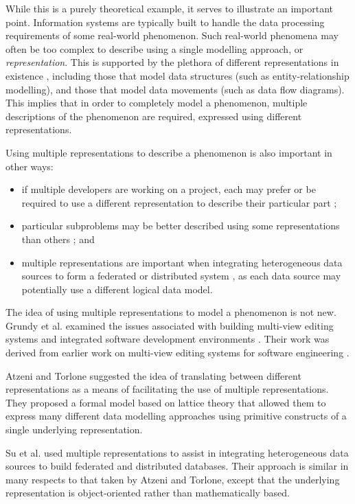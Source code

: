 \documentclass[10pt]{llncs}
\begin{document}
While this is a purely theoretical example, it serves to illustrate an important point. Information systems are typically built to handle the data processing requirements of some real-world phenomenon. Such real-world phenomena may often be too complex to describe using a single modelling approach, or \emph{representation}. This is supported by the plethora of different representations in existence \cite{Hull:R:1987,Tsic:D:1982}, including those that model data structures (such as entity-relationship modelling), and those that model data movements (such as data flow diagrams). This implies that in order to completely model a phenomenon, multiple descriptions of the phenomenon are required, expressed using different representations.

Using multiple representations to describe a phenomenon is also important in other ways:
\begin{itemize}
	\item if multiple developers are working on a project, each may prefer or be required to use a different representation to describe their particular part \cite{Atze:P:1996:EDBT};
	\item particular subproblems may be better described using some representations than others \cite{East:SM:1991:PhD}; and
	\item multiple representations are important when integrating heterogeneous data sources to form a federated or distributed system \cite{Atze:P:1996:EDBT}, as each data source may potentially use a different logical data model.
\end{itemize}

The idea of using multiple representations to model a phenomenon is not new. Grundy et al. examined the issues associated with building multi-view editing systems and integrated software development environments \cite{Grun:JC:1993:PhD,Grun:JC:1997:IJAST}. Their work was derived from earlier work on multi-view editing systems for software engineering \cite{Jaco:DA:1995:MultiView,Meye:S:1991:IEEE}.

Atzeni and Torlone \cite{Atze:P:1997:MDM} suggested the idea of translating between different representations as a means of facilitating the use of multiple representations. They proposed a formal model based on lattice theory that allowed them to express many different data modelling approaches using primitive constructs of a single underlying representation.
 
Su et al. \cite{Su:SYW:1993} used multiple representations to assist in integrating heterogeneous data sources to build federated and distributed databases. Their approach is similar in many respects to that taken by Atzeni and Torlone, except that the underlying representation is object-oriented rather than mathematically based.
\end{document}
